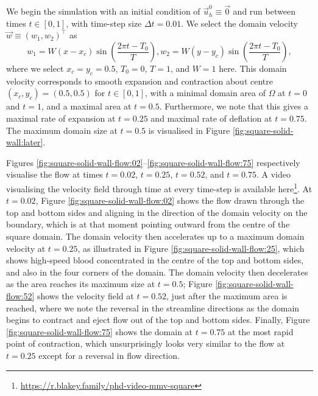             We begin the simulation with an initial condition of $\vec{u}_h^0 \equiv \vec{0}$ and run between times $t \in [0, 1]$, with time-step size $\Delta t = 0.01$. We select the domain velocity $\vec{w} \equiv (w_1, w_2)^\intercal$ as
            \begin{subequations}
                \begin{equation}
                    w_1 = W (x - x_c) \sin\left(\frac{2 \pi t - T_0}{T}\right),
                    \label{eq:oscillating-mesh-velocity:1}
                \end{equation}
                \begin{equation}
                    w_2 = W (y - y_c) \sin\left(\frac{2 \pi t - T_0}{T}\right),
                    \label{eq:oscillating-mesh-velocity:2}
                \end{equation}%
                \label{eq:oscillating-mesh-velocity}%
            \end{subequations}%
            where we select $x_c = y_c = 0.5$, $T_0 = 0$, $T = 1$, and $W = 1$ here. This domain velocity corresponds to smooth expansion and contraction about centre $(x_c, y_c) = (0.5, 0.5)$ for $t \in [0, 1]$, with a minimal domain area of $\Omega$ at $t = 0$ and $t=1$, and a maximal area at $t = 0.5$. Furthermore, we note that this gives a maximal rate of expansion at $t = 0.25$ and maximal rate of deflation at $t = 0.75$. The maximum domain size at $t=0.5$ is visualised in Figure \ref{fig:square-solid-wall:later}.
            
            Figures \ref{fig:square-solid-wall-flow:02}--\ref{fig:square-solid-wall-flow:75} respectively visualise the flow at times $t=0.02$, $t=0.25$, $t=0.52$, and $t=0.75$. A video visualising the velocity field through time at every time-step is available here\footnote{\url{https://r.blakey.family/phd-video-mmv-square}}. At $t = 0.02$, Figure \ref{fig:square-solid-wall-flow:02} shows the flow drawn through the top and bottom sides and aligning in the direction of the domain velocity on the boundary, which is at that moment pointing outward from the centre of the square domain. The domain velocity then accelerates up to a maximum domain velocity at $t = 0.25$, as illustrated in Figure \ref{fig:square-solid-wall-flow:25}, which shows high-speed blood concentrated in the centre of the top and bottom sides, and also in the four corners of the domain. The domain velocity then decelerates as the area reaches its maximum size at $t=0.5$; Figure \ref{fig:square-solid-wall-flow:52} shows the velocity field at $t = 0.52$, just after the maximum area is reached, where we note the reversal in the streamline directions as the domain begins to contract and eject flow out of the top and bottom sides. Finally, Figure \ref{fig:square-solid-wall-flow:75} shows the domain at $t = 0.75$ at the most rapid point of contraction, which unsurprisingly looks very similar to the flow at $t=0.25$ except for a reversal in flow direction.
            
